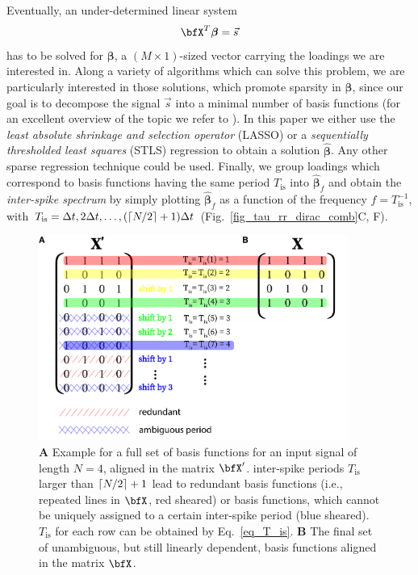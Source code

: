\documentclass[entropy,article,submit,pdftex,moreauthors]{Definitions/mdpi}
\DeclarePairedDelimiter\ceil{\lceil}{\rceil}
\begin{document}
Eventually, an under-determined linear system
\begin{equation}
\bfX^T \boldsymbol{\beta}=\vec{s}
\label{eq_linear_system}
\end{equation}  
has to be solved for $\boldsymbol\beta$, a $(M\times 1)$-sized vector carrying the loadings we are interested in. Along a variety of algorithms which can solve this problem, we are 
particularly interested in those solutions, which promote sparsity in $\boldsymbol\beta$, since our goal is to decompose the signal $\vec{s}$ into a minimal number of basis 
functions (for an excellent overview of the topic we refer to \citet{Brunton2019}). In this paper we either use the \textit{least absolute shrinkage and selection operator} 
(LASSO) \cite{Tibshirani1996} or a \textit{sequentially thresholded least squares} (STLS) regression \cite{Brunton2016,Brunton2019} to obtain a solution $\hat{\boldsymbol\beta}$. Any other 
sparse regression technique could be used. Finally, we group loadings 
which correspond to basis functions having the same period 
$T_\text{is}$ into $\hat{\boldsymbol\beta}_f$ and obtain the 
\textit{inter-spike spectrum} by simply plotting $\hat{\boldsymbol\beta}_f$ as a function of the frequency $f=T_\text{is}^{-1}$, with $T_\text{is}=\Delta t, 2\Delta t, \dots, (\ceil*{N/2}+1) \Delta t$ 
(Fig.~\ref{fig_tau_rr_dirac_comb}C, F).

\begin{figure}
\centering
\includegraphics[width=0.9\textwidth]{./figures/fig_tau_rr_basis_functions}
\caption{\textbf{A} Example for a full set of basis functions for an input signal of length $N=4$, aligned in the matrix $\bfX'$. inter-spike periods $T_{\text{is}}$ larger 
than $\ceil*{N/2}+1$ lead to redundant basis functions (i.e., repeated lines in $\bfX$, red sheared) or basis functions, which cannot be uniquely assigned to a certain inter-spike period 
(blue sheared). $T_{\text{is}}$ for each row can be obtained by Eq.~\eqref{eq_T_is}. \textbf{B} The final set of unambiguous, but still linearly dependent, basis functions aligned in the matrix $\bfX$.} \label{fig_tau_rr_basis_functions}
\end{figure}
\end{document}
